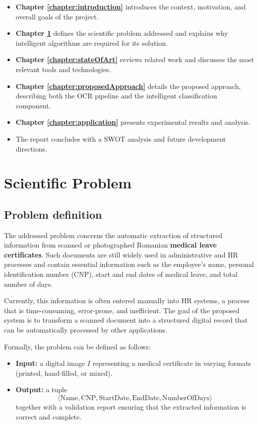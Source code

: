 \documentclass[runningheads,a4paper,11pt]{report}
\begin{document}
\begin{itemize}
  \item \textbf{Chapter \ref{chapter:introduction}} introduces the context, motivation, and overall goals of the project.
  \item \textbf{Chapter \ref{section:scientificProblem}} defines the scientific problem addressed and explains why intelligent algorithms are required for its solution.
  \item \textbf{Chapter \ref{chapter:stateOfArt}} reviews related work and discusses the most relevant tools and technologies.
  \item \textbf{Chapter \ref{chapter:proposedApproach}} details the proposed approach, describing both the OCR pipeline and the intelligent classification component.
  \item \textbf{Chapter \ref{chapter:application}} presents experimental results and analysis.
  \item The report concludes with a SWOT analysis and future development directions.
\end{itemize}


\chapter{Scientific Problem}
\label{section:scientificProblem}

\section{Problem definition}
\label{section:problemDefinition}

The addressed problem concerns the automatic extraction of structured information from scanned or photographed Romanian \textbf{medical leave certificates}.
Such documents are still widely used in administrative and HR processes and contain essential information such as the employee's name, personal identification number (CNP), start and end dates of medical leave, and total number of days.

Currently, this information is often entered manually into HR systems, a process that is time-consuming, error-prone, and inefficient.
The goal of the proposed system is to transform a scanned document into a structured digital record that can be automatically processed by other applications.

\bigskip
Formally, the problem can be defined as follows:
\begin{itemize}
  \item \textbf{Input:} a digital image $I$ representing a medical certificate in varying formats (printed, hand-filled, or mixed).
  \item \textbf{Output:} a tuple
  \[
  \langle \text{Name}, \text{CNP}, \text{StartDate}, \text{EndDate}, \text{NumberOfDays} \rangle
  \]
  together with a validation report ensuring that the extracted information is correct and complete.
\end{itemize}
\end{document}
